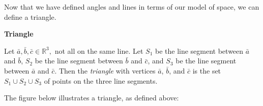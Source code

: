 \newpage

Now that we have defined angles and lines in terms of our model of space, we can define a triangle. 

\begin{definitionbox}
\textbf{Triangle}

    Let \(\bar{a}, \bar{b}, \bar{c} \in \mathbb{R}^3,\) not all on the same line. Let \(S_1\) be 
    the line segment between \(\bar{a}\) and \(\bar{b}\), \(S_2\) be the line segment between
    \(\bar{b}\) and \(\bar{c}\), and \(S_3\) be the line segment between \(\bar{a}\) and \(\bar{c}\).
    Then the \textit{triangle} with vertices \(\bar{a}\), \( \bar{b}\), and \( \bar{c}\) is the set \(S_1 \cup S_2 \cup S_3\) 
    of points on the three line segments.
\end{definitionbox}

The figure below illustrates a triangle, as defined above:

 
\begin{center}
\end{center}

